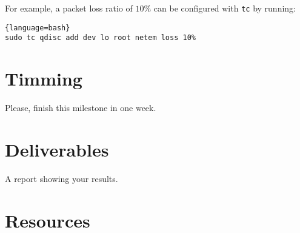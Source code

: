 For example, a packet loss ratio of $10\%$ can be configured with
\texttt{tc} by running:

  \begin{lstlisting}{language=bash}
sudo tc qdisc add dev lo root netem loss 10%
  \end{lstlisting}

\section{Timming}

Please, finish this milestone in one week.

\section{Deliverables}

A report showing your results.

\section{Resources}


